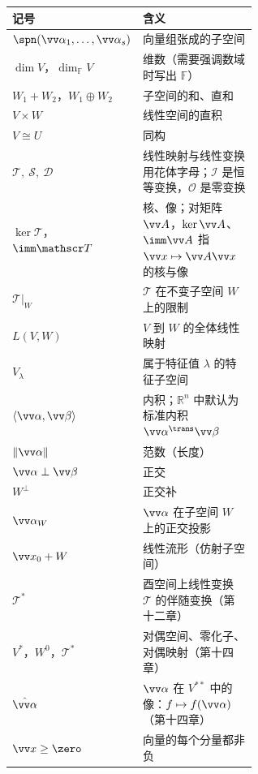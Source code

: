\begin{center}
	\begin{longtable}{l>{\raggedright\arraybackslash}p{0.6\linewidth}}
		\toprule
		记号 & 含义 \\
		\midrule
		\endhead
		$\spn(\vv\alpha_1,\ldots,\vv\alpha_s)$ & 向量组张成的子空间 \\
		$\dim V$，$\dim_{\mathbb{F}}V$ & 维数（需要强调数域时写出 $\mathbb{F}$） \\
		$W_1+W_2$，$W_1\oplus W_2$ & 子空间的和、直和 \\
		$V\times W$ & 线性空间的直积 \\
		$V\cong U$ & 同构 \\
		$\mathscr T,\ \mathscr S,\ \mathscr D$ & 线性映射与线性变换用花体字母；$\mathscr I$ 是恒等变换，$\mathscr O$ 是零变换 \\
		$\ker\mathscr T$，$\imm\mathscr T$ & 核、像；对矩阵 $\vv A$，$\ker\vv A$、$\imm\vv A$ 指 $\vv x\mapsto\vv A\vv x$ 的核与像 \\
		$\mathscr T|_W$ & $\mathscr T$ 在不变子空间 $W$ 上的限制 \\
		$L(V,W)$ & $V$ 到 $W$ 的全体线性映射 \\
		$V_\lambda$ & 属于特征值 $\lambda$ 的特征子空间 \\
		$\langle\vv\alpha,\vv\beta\rangle$ & 内积；$\mathbb{R}^n$ 中默认为标准内积 $\vv\alpha^\trans\vv\beta$ \\
		$\|\vv\alpha\|$ & 范数（长度） \\
		$\vv\alpha\perp\vv\beta$ & 正交 \\
		$W^\perp$ & 正交补 \\
		$\vv\alpha_W$ & $\vv\alpha$ 在子空间 $W$ 上的正交投影 \\
		$\vv x_0+W$ & 线性流形（仿射子空间） \\
		$\mathscr T^*$ & 酉空间上线性变换 $\mathscr T$ 的伴随变换（第十二章） \\
		$V^*$，$W^0$，$\mathscr T^*$ & 对偶空间、零化子、对偶映射（第十四章） \\
		$\hat{\vv\alpha}$ & $\vv\alpha$ 在 $V^{**}$ 中的像：$f\mapsto f(\vv\alpha)$（第十四章） \\
		$\vv x\ge\zero$ & 向量的每个分量都非负 \\
		\bottomrule
	\end{longtable}
\end{center}

